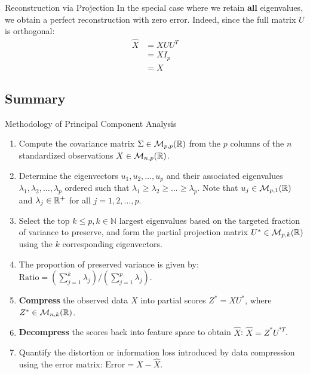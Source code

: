 \begin{frame}{Reconstruction via Projection}
	In the special case where we retain \textbf{all} eigenvalues, we obtain a perfect reconstruction with zero error. Indeed, since the full matrix $U$ is orthogonal:
	\begin{equation}
		\begin{aligned}
			\hat{X} &= X U U^T \\
			&= X I_p \\
			&= X
		\end{aligned}
		\nonumber
	\end{equation}
\end{frame}

\subsection[Summary]{Summary}

\begin{frame}{Methodology of Principal Component Analysis}
	\begin{enumerate}
		\item Compute the covariance matrix $\Sigma \in \mathcal{M}_{p,p}(\mathbb{R})$ from the $p$ columns of the $n$ standardized observations $X \in \mathcal{M}_{n,p}(\mathbb{R})$.
		\pause
		\item Determine the eigenvectors $u_1, u_2, \dots, u_p$ and their associated eigenvalues $\lambda_1, \lambda_2, \dots, \lambda_p$ ordered such that $\lambda_1 \ge \lambda_2 \ge \dots \ge \lambda_p$. Note that $u_j \in \mathcal{M}_{p,1}(\mathbb{R})$ and $\lambda_j \in \mathbb{R}^+$ for all $j=1, 2, \dots, p$.
		\pause
		\item Select the top $k \le p, k \in \mathbb{N}$ largest eigenvalues based on the targeted fraction of variance to preserve, and form the partial projection matrix $U^* \in \mathcal{M}_{p,k}(\mathbb{R})$ using the $k$ corresponding eigenvectors.
		\pause
		\item The proportion of preserved variance is given by: $\text{Ratio} = \left(\sum_{j=1}^k \lambda_j\right) / \left(\sum_{j=1}^p \lambda_j\right)$.
		\pause
		\item \textbf{Compress} the observed data $X$ into partial scores $Z^* = X U^*$, where $Z^* \in \mathcal{M}_{n,k}(\mathbb{R})$.
		\pause
		\item \textbf{Decompress} the scores back into feature space to obtain $\hat{X}$: $\hat{X} = Z^* U^{*T}$.
		\pause
		\item Quantify the distortion or information loss introduced by data compression using the error matrix: $\text{Error} = X - \hat{X}$.
	\end{enumerate}
\end{frame}